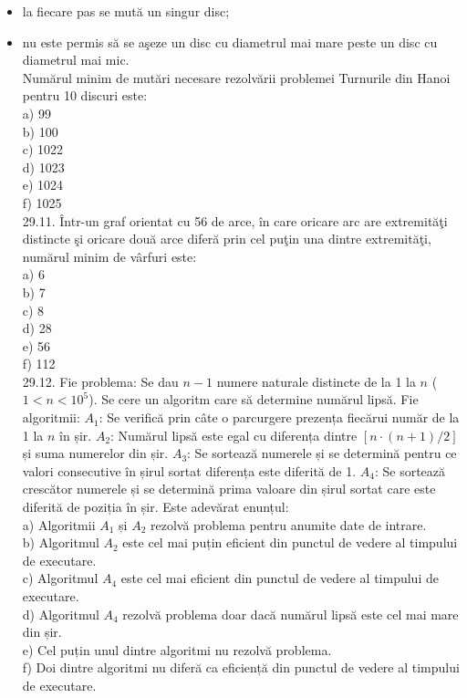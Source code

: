 \begin{itemize}
  \item la fiecare pas se mută un singur disc;
  \item nu este permis să se aşeze un disc cu diametrul mai mare peste un disc cu diametrul mai mic.\\
Numărul minim de mutări necesare rezolvării problemei Turnurile din Hanoi pentru 10 discuri este:
\\
a) 99
\\
b) 100
\\
c) 1022
\\
d) 1023
\\
e) 1024
\\
f) 1025
\\
29.11. Într-un graf orientat cu 56 de arce, în care oricare arc are extremităţi distincte şi oricare două arce diferă prin cel puţin una dintre extremităţi, numărul minim de vârfuri este:
\\
a) 6
\\
b) 7
\\
c) 8
\\
d) 28
\\
e) 56
\\
f) 112
\\
29.12. Fie problema: Se dau $n-1$ numere naturale distincte de la 1 la $n$ ($1<n<10^{5}$). Se cere un algoritm care să determine numărul lipsă. Fie algoritmii:
$A_{1}$: Se verifică prin câte o parcurgere prezența fiecărui număr de la 1 la $n$ în șir.
$A_{2}$: Numărul lipsă este egal cu diferența dintre $[n \cdot (n+1) / 2]$ și suma numerelor din șir.
$A_{3}$: Se sortează numerele și se determină pentru ce valori consecutive în șirul sortat diferența este diferită de 1.
$A_{4}$: Se sortează crescător numerele și se determină prima valoare din șirul sortat care este diferită de poziția în șir.
Este adevărat enunțul:
\\
a) Algoritmii $A_{1}$ și $A_{2}$ rezolvă problema pentru anumite date de intrare.
\\
b) Algoritmul $A_{2}$ este cel mai puțin eficient din punctul de vedere al timpului de executare.
\\
c) Algoritmul $A_{4}$ este cel mai eficient din punctul de vedere al timpului de executare.
\\
d) Algoritmul $A_{4}$ rezolvă problema doar dacă numărul lipsă este cel mai mare din șir.
\\
e) Cel puțin unul dintre algoritmi nu rezolvă problema.
\\
f) Doi dintre algoritmi nu diferă ca eficiență din punctul de vedere al timpului de executare.

\end{itemize}
